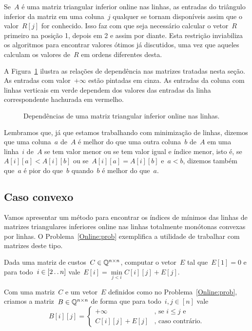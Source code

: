 Se~$A$ é uma matriz triangular inferior online nas linhas, as entradas do triângulo inferior da matriz em uma coluna~$j$ qualquer se tornam disponíveis assim que o valor~$R[j]$ for conhecido. Isso faz com que seja necessário calcular o vetor~$R$ primeiro na posição 1, depois em 2 e assim por diante. Esta restrição inviabiliza os algoritmos para encontrar valores ótimos já discutidos, uma vez que aqueles calculam os valores de~$R$ em ordens diferentes desta.

A Figura~\ref{Online:matrix:fig} ilustra as relações de dependência nas matrizes tratadas nesta seção. As entradas com valor~$+\infty$ estão pintadas em cinza. As entradas da coluna com linhas verticais em verde dependem dos valores das entradas da linha correspondente hachurada em vermelho. 

\begin{figure}[h]
    \centering
    
    \caption{Dependências de uma matriz triangular inferior online nas linhas.} \label{Online:matrix:fig}
\end{figure}

Lembramos que, já que estamos trabalhando com minimização de linhas, dizemos que uma coluna~$a$ de~$A$ é melhor do que uma outra coluna~$b$ de~$A$ em uma linha~$i$ de~$A$ se tem valor menor ou se tem valor igual e índice menor, isto é, se~$A[i][a] < A[i][b]$ ou se~$A[i][a] = A[i][b]$ e~$a < b$, dizemos também que~$a$ é pior do que~$b$ quando~$b$ é melhor do que~$a$.

\subsection{Caso convexo}

Vamos apresentar um método para encontrar os índices de mínimos das linhas de matrizes triangulares inferiores online nas linhas totalmente monótonas convexas por linhas. O Problema~\ref{Online:prob} exemplifica a utilidade de trabalhar com matrizes deste tipo.

\begin{prob} \label{Online:prob}
Dada uma matriz de custos~$C \in \mathbb{Q}^{n \times n}$, computar o vetor~$E$ tal que~$E[1] = 0$ e para todo~$i \in [2 \,.\,.\, n]$ vale~$E[i] = \min\limits_{j < i} C[i][j] + E[j]$.
\end{prob}

Com uma matriz~$C$ e um vetor~$E$ definidos como no Problema~\ref{Online:prob}, criamos a matriz~$B \in \mathbb{Q}^{n \times n}$ de forma que para todo~$i,j \in [n]$ vale
\begin{equation} \label{Online:Bmat}
    B[i][j] = \begin{cases}
        +\infty & \text{, se } i \leq j \text{ e } \\
        C[i][j] + E[j]    & \text{, caso contrário.}
    \end{cases}
\end{equation}

